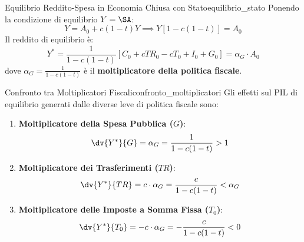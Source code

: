\begin{modello}{Equilibrio Reddito-Spesa in Economia Chiusa con Stato}{equilibrio_stato}
Ponendo la condizione di equilibrio $Y = \SA$:
\begin{equation}
    Y = A_0 + c(1 - t)Y \implies Y\left[ 1 - c(1 - t) \right] = A_0
\end{equation}
Il reddito di equilibrio è:
\begin{equation}
    Y^* = \frac{1}{1 - c(1 - t)} \left[ C_0 + c TR_0 - c T_0 + I_0 + G_0 \right] = \alpha_G \cdot A_0
\end{equation}
dove $\alpha_G = \frac{1}{1 - c(1 - t)}$ è il \textbf{moltiplicatore della politica fiscale}.
\end{modello}

\begin{teorema}{Confronto tra Moltiplicatori Fiscali}{confronto_moltiplicatori}
Gli effetti sul PIL di equilibrio generati dalle diverse leve di politica fiscale sono:
\begin{enumerate}
    \item \textbf{Moltiplicatore della Spesa Pubblica ($G$)}:
    \begin{equation}
        \dv{Y^*}{G} = \alpha_G = \frac{1}{1 - c(1 - t)} > 1
    \end{equation}
    \item \textbf{Moltiplicatore dei Trasferimenti ($TR$)}:
    \begin{equation}
        \dv{Y^*}{TR} = c \cdot \alpha_G = \frac{c}{1 - c(1 - t)} < \alpha_G
    \end{equation}
    \item \textbf{Moltiplicatore delle Imposte a Somma Fissa ($T_0$)}:
    \begin{equation}
        \dv{Y^*}{T_0} = -c \cdot \alpha_G = -\frac{c}{1 - c(1 - t)} < 0
    \end{equation}
\end{enumerate}
\end{teorema}

